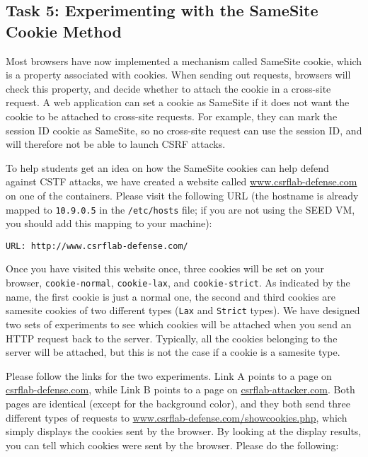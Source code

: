 \subsection{Task 5: Experimenting with the SameSite Cookie Method} 

Most browsers have now implemented a mechanism called SameSite cookie, 
which is a property associated with cookies. When sending out 
requests, browsers will check this property, and decide whether 
to attach the cookie in a cross-site request. A web application can
set a cookie as SameSite if it does not want the cookie to be 
attached to cross-site requests. For example, they can mark
the session ID cookie as SameSite, so no cross-site request
can use the session ID, and will therefore not be able to 
launch CSRF attacks. 


To help students get an idea on how the SameSite cookies can
help defend against CSTF attacks, we have created a website
called \url{www.csrflab-defense.com} on one of the containers. Please 
visit the following URL (the hostname is already mapped 
to \texttt{10.9.0.5} in the \texttt{/etc/hosts} file; if you are 
not using the SEED VM, you should add this mapping to your machine): 

\begin{lstlisting}
URL: http://www.csrflab-defense.com/
\end{lstlisting}

Once you have visited this website once, three cookies will be 
set on your browser, \texttt{cookie-normal}, \texttt{cookie-lax},
and \texttt{cookie-strict}. As indicated by the name,
the first cookie is just a normal one, the second and third cookies
are samesite cookies of two different types (\texttt{Lax} and \texttt{Strict}
types). We have designed two sets of experiments to see 
which cookies will be attached when you send an HTTP request
back to the server. Typically, all the cookies belonging to the server
will be attached, but this is not the case if a cookie is a samesite type. 


Please follow the links for the two experiments. Link A points to a page 
on \url{csrflab-defense.com}, while Link B points to a page 
on \url{csrflab-attacker.com}. Both pages are identical (except for the background
color), and they both send three different types of requests to
\url{www.csrflab-defense.com/showcookies.php}, which
simply displays the cookies sent by the browser. By looking 
at the display results, you can tell which cookies were sent 
by the browser. Please do the following: 


